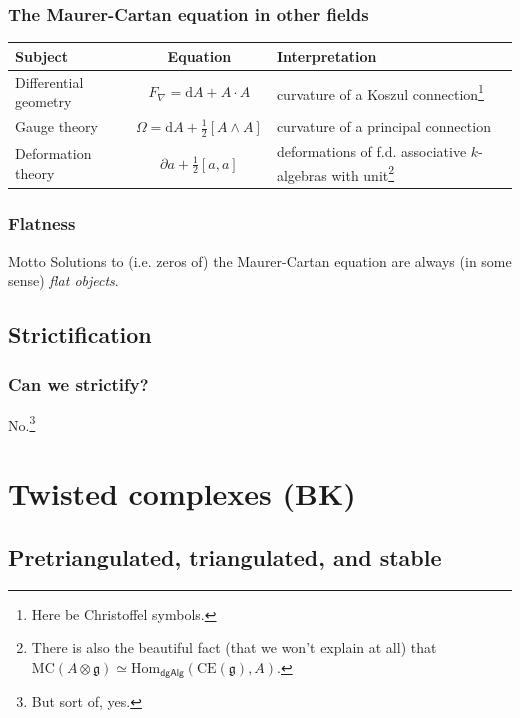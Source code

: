 \documentclass{beamer}
\begin{document}
        \begin{frame}\frametitle{The Maurer-Cartan equation in other fields}
            \begin{table}
                \begin{tabular}{p{1.8cm}cp{3.9cm}}\toprule
                    Subject & Equation & Interpretation\\\midrule
                    Differential geometry & $F_\nabla = \mathrm{d}A + A\cdot A$ & curvature of a Koszul connection\footnote{Here be Christoffel symbols.}\\[.5em]
                    Gauge theory & $\Omega = \mathrm{d}A + \frac12[A\wedge A]$ & curvature of a principal connection\\[.5em]
                    Deformation theory & $\partial a+\frac12[a,a]$ & deformations of f.d. associative $k$-algebras with unit\footnote{There is also the beautiful fact (that we won't explain at all) that $\mathrm{MC}(A\otimes\mathfrak{g}) \simeq \mathrm{Hom}_\mathsf{dgAlg}(\mathrm{CE}(\mathfrak{g}),A)$.}
                    \\\bottomrule
                \end{tabular}
            \end{table}
        \end{frame}

        \begin{frame}\frametitle{Flatness}
            \begin{block}{Motto}
                Solutions to (i.e. zeros of) the Maurer-Cartan equation are always (in some sense) \emph{flat objects}.
            \end{block}
        \end{frame}

    \subsection{Strictification}

        \begin{frame}\frametitle{Can we strictify?}
            No.\footnote{But sort of, yes.}
        \end{frame}


\section{Twisted complexes (BK)}
    
    \subsection{Pretriangulated, triangulated, and stable}
\end{document}
